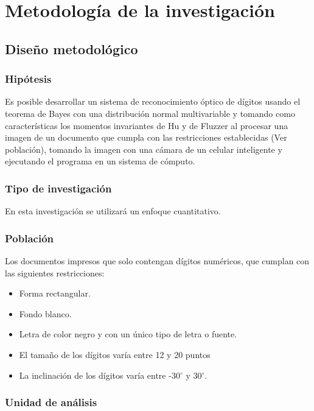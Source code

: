 \documentclass[a4paper, 11pt, oneside]{report}
\begin{document}
\chapter{Metodología de la investigación}
\label{chap:metodology}

\section{Diseño metodológico}

\subsection{Hipótesis}

Es posible desarrollar un sistema de reconocimiento óptico de dígitos usando el teorema de Bayes con una distribución normal multivariable y tomando como características los momentos invariantes de Hu y de Fluzzer al procesar una imagen de un documento que cumpla con las restricciones establecidas (Ver población), tomando la imagen con	una cámara de un celular inteligente y ejecutando el programa en un sistema de cómputo.
	
\subsection{Tipo de investigación}

En esta investigación se utilizará un enfoque cuantitativo.

\subsection{Población}
\label{sect:population}

Los documentos impresos que solo contengan dígitos numéricos, que cumplan con las siguientes restricciones:
\begin{itemize}
\item Forma rectangular.
\item Fondo blanco.
\item Letra de color negro y con un único tipo de letra o fuente.
\item El tamaño de los dígitos varía entre 12 y 20 puntos
\item La inclinación de los dígitos varía entre -30$^{\circ}$ y 30$^{\circ}$.
\end{itemize}

\subsection{Unidad de análisis}
\end{document}
